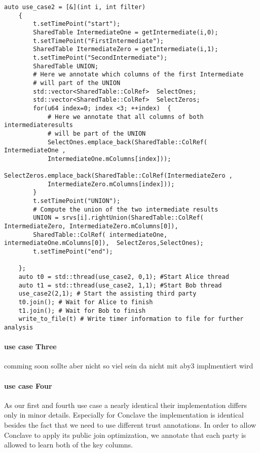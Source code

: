 \label{Listing 5.7}   
\begin{lstlisting}[caption={Simpifiyed Protocol for our second use case in ABY3}]
	auto use_case2 = [&](int i, int filter)
	{
		t.setTimePoint("start"); 
		SharedTable IntermediateOne = getIntermediate(i,0);
		t.setTimePoint("FirstIntermediate"); 
		SharedTable ItermediateZero = getIntermediate(i,1);
		t.setTimePoint("SecondIntermediate");
		SharedTable UNION;
		# Here we annotate which columns of the first Intermediate 
		# will part of the UNION
		std::vector<SharedTable::ColRef>  SelectOnes; 
		std::vector<SharedTable::ColRef>  SelectZeros; 
		for(u64 index=0; index <3; ++index)  {
			# Here we annotate that all columns of both intermediateresults 
			# will be part of the UNION
			SelectOnes.emplace_back(SharedTable::ColRef( IntermediateOne , 
			IntermediateOne.mColumns[index]));
			SelectZeros.emplace_back(SharedTable::ColRef(IntermediateZero , 
			IntermediateZero.mColumns[index]));
		}
		t.setTimePoint("UNION");
		# Compute the union of the two intermediate results
		UNION = srvs[i].rightUnion(SharedTable::ColRef( IntermediateZero, IntermediateZero.mColumns[0]),
		SharedTable::ColRef( intermediateOne, intermediateOne.mColumns[0]),  SelectZeros,SelectOnes);
		t.setTimePoint("end");
		
	};
	auto t0 = std::thread(use_case2, 0,1); #Start Alice thread
	auto t1 = std::thread(use_case2, 1,1); #Start Bob thread
	use_case2(2,1); # Start the assisting third party
	t0.join(); # Wait for Alice to finish
	t1.join(); # Wait for Bob to finish
	write_to_file(t) # Write timer information to file for further analysis
\end{lstlisting}

\paragraph{use case Three}
comming soon sollte aber nicht so viel sein da nicht mit aby3 implmentiert wird

\paragraph{use case Four}
As our first and fourth use case a nearly identical their implementation differs only in minor details. Especially for Conclave the implementation is identical besides the fact that we need to use different trust annotations. In order to allow Conclave to apply its public join optimization, we annotate that each party is allowed to learn both of the key columns.


